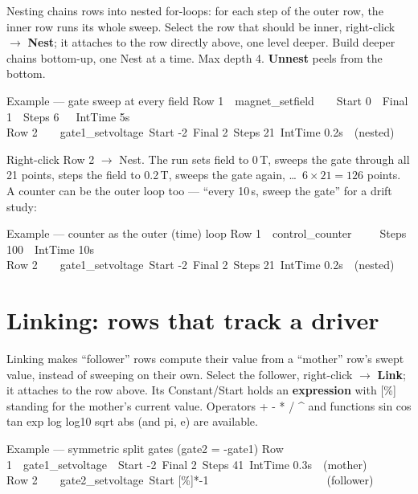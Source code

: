 \documentclass[11pt,a4paper]{article}
\newcommand{\code}[1]{{\ttfamily\color{qcode}#1}}
\begin{document}
Nesting chains rows into nested for-loops: for each step of the outer row,
the inner row runs its whole sweep. Select the row that should be inner,
right-click $\rightarrow$ \textbf{Nest}; it attaches to the row directly
above, one level deeper. Build deeper chains bottom-up, one Nest at a time.
Max depth 4. \textbf{Unnest} peels from the bottom.

\begin{gridex}{Example --- gate sweep at every field}
Row 1\ \ magnet\_setfield\ \ \ \ Start 0\ \ Final 1\ \ Steps 6\ \ \ IntTime 5s\\
Row 2\ \ \ \ gate1\_setvoltage\ Start -2\ Final 2\ Steps 21\ IntTime 0.2s\ \ (nested)
\end{gridex}

\noindent Right-click Row 2 $\rightarrow$ Nest. The run sets field to 0\,T,
sweeps the gate through all 21 points, steps the field to 0.2\,T, sweeps the
gate again, \ldots\ $6\times21=126$ points. A counter can be the outer loop
too --- ``every 10\,s, sweep the gate'' for a drift study:

\begin{gridex}{Example --- counter as the outer (time) loop}
Row 1\ \ control\_counter\ \ \ \ \ Steps 100\ \ IntTime 10s\\
Row 2\ \ \ \ gate1\_setvoltage\ Start -2\ Final 2\ Steps 21\ IntTime 0.2s\ \ (nested)
\end{gridex}

\section{Linking: rows that track a driver}\label{sec:linking}

Linking makes ``follower'' rows compute their value from a ``mother'' row's
swept value, instead of sweeping on their own. Select the follower,
right-click $\rightarrow$ \textbf{Link}; it attaches to the row above. Its
Constant/Start holds an \textbf{expression} with \code{[\%]} standing for the
mother's current value. Operators \code{+ - * / \textasciicircum} and
functions \code{sin cos tan exp log log10 sqrt abs} (and \code{pi},
\code{e}) are available.

\begin{gridex}{Example --- symmetric split gates (gate2 = -gate1)}
Row 1\ \ gate1\_setvoltage\ \ Start -2\ Final 2\ Steps 41\ IntTime 0.3s\ \ (mother)\\
Row 2\ \ \ \ gate2\_setvoltage\ Start [\%]*-1\ \ \ \ \ \ \ \ \ \ \ \ \ \ \ \ \ \ \ \ \ (follower)
\end{gridex}
\end{document}
